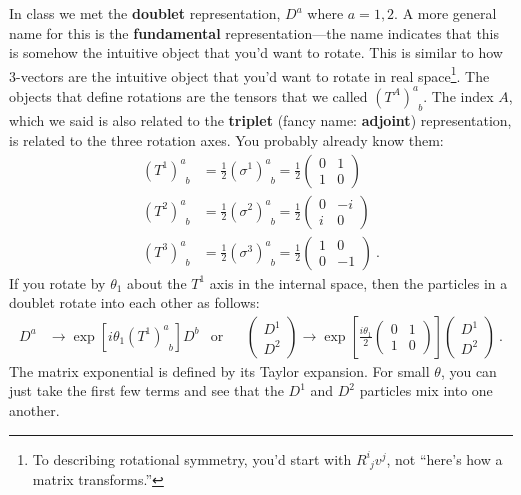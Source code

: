 \documentclass[12pt]{article}
\begin{document}
In class we met the \textbf{doublet} representation, $D^a$ where $a=1,2$. A more general name for this is the \textbf{fundamental} representation---the name indicates that this is somehow the intuitive object that you'd want to rotate. This is similar to how 3-vectors are the intuitive object that you'd want to rotate in real space\footnote{To describing rotational symmetry, you'd start with $R^i_{\phantom i j} v^j$, not ``here's how a matrix transforms.''}. The objects that define rotations are the tensors that we called $(T^A)^a_{\phantom a b}$. The index $A$, which we said is also related to the \textbf{triplet} (fancy name: \textbf{adjoint}) representation, is related to the three rotation axes. You probably already know them:
\begin{align}
	(T^1)^a_{\phantom a b} &= \frac 12 (\sigma^1)^a_{\phantom a b} =
	\frac 12
	\begin{pmatrix}
		0 & 1 \\
		1 & 0
	\end{pmatrix}
	\\
	(T^2)^a_{\phantom a b} &= \frac 12 (\sigma^2)^a_{\phantom a b} =
	\frac 12
	\begin{pmatrix}
		0 & -i \\
		i & 0
	\end{pmatrix}
	\\
	(T^3)^a_{\phantom a b} &= \frac 12 (\sigma^3)^a_{\phantom a b} =
	\frac 12
	\begin{pmatrix}
		1 & 0 \\
		0 & -1
	\end{pmatrix} \ .
\end{align}
If you rotate by $\theta_1$ about the $T^1$ axis in the internal space, then the particles in a doublet rotate into each other as follows:
\begin{align}
		D^a & \to \exp\left[i\theta_1 (T^1)^a_{\phantom{a}b}\right]
		D^b
		&
		\text{or}&
		&
	\begin{pmatrix}
		D^1 \\
		D^2
	\end{pmatrix}
	\to 
	\exp\left[\frac{i\theta_1}2
	\begin{pmatrix}
		0 & 1 \\
		1 & 0
	\end{pmatrix}\right]
	\begin{pmatrix}
		D^1 \\
		D^2
	\end{pmatrix} \ .
\end{align}
The matrix exponential is defined by its Taylor expansion. For small $\theta$, you can just take the first few terms and see that the $D^1$ and $D^2$ particles mix into one another. 
\end{document}
